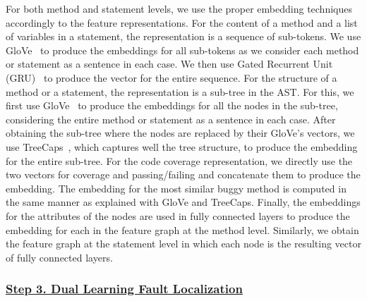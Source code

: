 For both method and statement levels, we use the proper embedding
techniques accordingly to the feature representations. For the content
of a method and a list of variables in a statement, the representation
is a sequence of sub-tokens. We use GloVe~\cite{glove2014} to produce
the embeddings for all sub-tokens as we consider each method or
statement as a sentence in each case. We then use Gated Recurrent Unit
(GRU)~\cite{} to produce the vector for the entire sequence. For the
structure of a method or a statement, the representation is a sub-tree
in the AST. For this, we first use GloVe~\cite{glove2014} to produce
the embeddings for all the nodes in the sub-tree, considering the
entire method or statement as a sentence in each case. After obtaining
the sub-tree where the nodes are replaced by their GloVe's vectors, we
use TreeCaps~\cite{bui2021treecaps}, which captures well the tree
structure, to produce the embedding for the entire sub-tree.  For the
code coverage representation, we directly use the two vectors for
coverage and passing/failing and concatenate them to produce the
embedding. The embedding for the most similar buggy method is computed
in the same manner as explained with GloVe and TreeCaps. Finally, the
embeddings for the attributes of the nodes are used in fully connected
layers to produce the embedding for each in the feature graph at the
method level. Similarly, we obtain the feature graph at the statement
level in which each node is the resulting vector of fully connected
layers.



\subsubsection*{\underline{Step 3. Dual Learning Fault Localization}}


